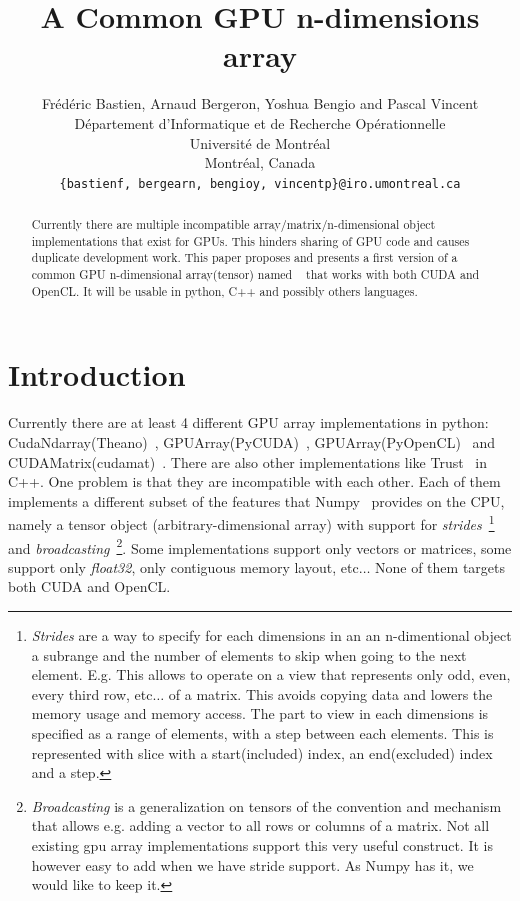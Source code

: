 \documentclass{article} %
\title{A Common GPU n-dimensions array}
\author{
Frédéric Bastien, Arnaud Bergeron, Yoshua Bengio and Pascal Vincent \\
D\'epartement d'Informatique et de Recherche Op\'erationnelle\\
Universit\'e de Montr\'eal\\
Montr\'eal, Canada \\
\texttt{\{bastienf, bergearn, bengioy, vincentp\}@iro.umontreal.ca} \\
}
\begin{document}
\maketitle

\begin{abstract}
Currently there are multiple incompatible array/matrix/n-dimensional object implementations
that exist for GPUs. This hinders sharing of GPU code and causes
duplicate development work. This paper proposes and presents a
first version of a common GPU n-dimensional
array(tensor) named ~\citep{GpuNdArray} that works with both CUDA and OpenCL. 
It will be usable in python, C++ and possibly others languages.
\end{abstract}

\section{Introduction}
Currently there are at least 4 different GPU array implementations in
python: CudaNdarray(Theano)~\citep{bergstra+al:2010-scipy},
GPUArray(PyCUDA)~\citep{kloeckner_pycuda_2009},
GPUArray(PyOpenCL)~\citep{kloeckner_pycuda_2009} and
CUDAMatrix(cudamat)~\citep{cudamat-TR2009}. There are also other
implementations like Trust~\citep{Thrust} in C++. One problem is that they are
incompatible with each other. Each of them implements a different
subset of the features that Numpy~\citep{numpy-2007} provides on the
CPU, namely a tensor object (arbitrary-dimensional array) with support
for \emph{strides}~\footnote{
\emph{Strides} are a way to specify for each dimensions in an an n-dimentional object a subrange and the number of elements to skip when going
to the next element. E.g. This allows
to operate on a view that represents only odd, even, every third row, etc$\ldots$ of
a matrix. This avoids copying data and lowers the memory usage and memory
access. The part to view in each dimensions is specified as a range of elements, with a
step between each elements. This is represented with slice with a start(included) index, an
end(excluded) index and a step.
}
 and \emph{broadcasting}~\footnote{
\emph{Broadcasting} is a generalization on tensors of the convention and mechanism that allows e.g. adding a
vector to all rows or columns of a matrix. Not all existing gpu array implementations
support this very useful construct. It is however easy to add when we have
stride support. As Numpy has it, we would like to keep it.}.  Some implementations
support only vectors or matrices, some support only \emph{float32},
only contiguous memory layout, etc$\ldots$ None of them targets both
CUDA and OpenCL.
\end{document}
